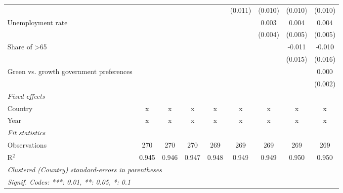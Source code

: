 \begin{table}[htbp]
\begin{tabular}{lcccccccc}
                                                             &         &         &             &              & (0.011)      & (0.010)      & (0.010)      & (0.010)\\   
      Unemployment rate                                      &         &         &             &              &              & 0.003        & 0.004        & 0.004\\   
                                                             &         &         &             &              &              & (0.004)      & (0.005)      & (0.005)\\   
      Share of >65                                           &         &         &             &              &              &              & -0.011       & -0.010\\   
                                                             &         &         &             &              &              &              & (0.015)      & (0.016)\\   
      Green vs. growth government preferences                &         &         &             &              &              &              &              & 0.000\\   
                                                             &         &         &             &              &              &              &              & (0.002)\\   
      \emph{Fixed effects}\\
      Country                                                & x       & x       & x           & x            & x            & x            & x            & x\\  
      Year                                                   & x       & x       & x           & x            & x            & x            & x            & x\\  
      \midrule \emph{Fit statistics}\\
      Observations                                           & 270     & 270     & 270         & 269          & 269          & 269          & 269          & 269\\  
      R$^2$                                                  & 0.945   & 0.946   & 0.947       & 0.948        & 0.949        & 0.949        & 0.950        & 0.950\\  
      \midrule
      \multicolumn{9}{l}{\emph{Clustered (Country) standard-errors in parentheses}}\\
      \multicolumn{9}{l}{\emph{Signif. Codes: ***: 0.01, **: 0.05, *: 0.1}}\\
   \end{tabular}
\end{table}


